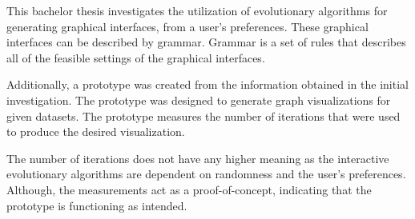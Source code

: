 This bachelor thesis investigates the utilization of evolutionary algorithms for generating graphical interfaces, from a user’s preferences. These graphical interfaces can be described by grammar. Grammar is a set of rules that describes all of the feasible settings of the graphical interfaces.

Additionally, a prototype was created from the information obtained in the initial investigation. The prototype was designed to generate graph visualizations for given datasets. The prototype measures the number of iterations that were used to produce the desired visualization.

The number of iterations does not have any higher meaning as the interactive evolutionary algorithms are dependent on randomness and the user's preferences. Although, the measurements act as a proof-of-concept, indicating that the prototype is functioning as intended.

